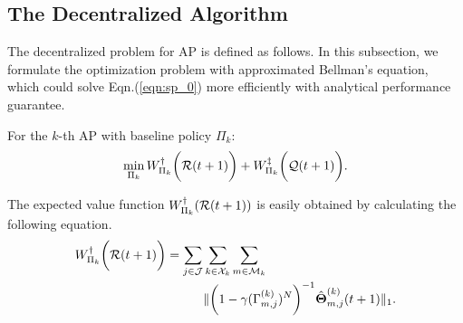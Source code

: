 \subsection{The Decentralized Algorithm}
The decentralized problem for AP is defined as follows.
In this subsection, we formulate the optimization problem with approximated Bellman's equation, which could solve Eqn.(\ref{eqn:sp_0}) more efficiently with analytical performance guarantee.
\begin{problem}
    For the $k$-th AP with baseline policy $\Pi_{k}$:
    \begin{align}
        \min_{\Pi_{k}} W^{\dagger}_{\Pi_{k}}\bigg(\mathcal{R}(t+1)\bigg) + W^{\ddagger}_{\Pi_{k}}\bigg(\mathcal{Q}(t+1)\bigg).
        \label{eqn:partial}
    \end{align}
\end{problem}

The expected value function $W^{\dagger}_{\Pi_{k}}(\mathcal{R}(t+1))$ is easily obtained by calculating the following equation.
\begin{align}
    W^{\dagger}_{\Pi_{k}}\bigg(\mathcal{R}(t+1)\bigg) = \sum_{j\in\mathcal{J}}&\sum_{k\in\mathcal{X}_{k}}\sum_{m\in\mathcal{M}_{k}}
    \nonumber\\
    &\lVert
        \bigg( 1 - \gamma ({\Gamma}^{(k)}_{m,j})^{N} \bigg)^{-1} \hat{\boldsymbol{\Theta}}^{(k)}_{m,j}(t+1)
    \|_1.
    \label{w_ap}
\end{align}

